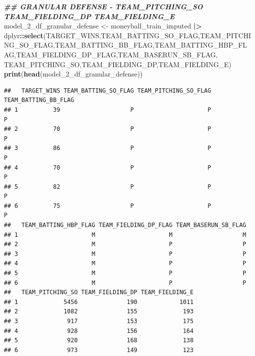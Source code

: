 \documentclass[
]{article}
\newenvironment{Shaded}{\begin{snugshade}}{\end{snugshade}}
\newcommand{\DocumentationTok}[1]{\textcolor[rgb]{0.56,0.35,0.01}{\textbf{\textit{#1}}}}
\newcommand{\FunctionTok}[1]{\textcolor[rgb]{0.13,0.29,0.53}{\textbf{#1}}}
\newcommand{\NormalTok}[1]{#1}
\newcommand{\OtherTok}[1]{\textcolor[rgb]{0.56,0.35,0.01}{#1}}
\newcommand{\SpecialCharTok}[1]{\textcolor[rgb]{0.81,0.36,0.00}{\textbf{#1}}}
\begin{document}
\begin{Shaded}
\begin{Highlighting}[]
\DocumentationTok{\#\# GRANULAR DEFENSE {-} TEAM\_PITCHING\_SO TEAM\_FIELDING\_DP TEAM\_FIELDING\_E}
\NormalTok{model\_2\_df\_granular\_defense }\OtherTok{\textless{}{-}}\NormalTok{ moneyball\_train\_imputed }\SpecialCharTok{|\textgreater{}} 
\NormalTok{  dplyr}\SpecialCharTok{::}\FunctionTok{select}\NormalTok{(TARGET\_WINS,TEAM\_BATTING\_SO\_FLAG,TEAM\_PITCHING\_SO\_FLAG,TEAM\_BATTING\_BB\_FLAG,TEAM\_BATTING\_HBP\_FLAG,TEAM\_FIELDING\_DP\_FLAG,TEAM\_BASERUN\_SB\_FLAG,}
\NormalTok{         TEAM\_PITCHING\_SO,TEAM\_FIELDING\_DP,TEAM\_FIELDING\_E)}
\FunctionTok{print}\NormalTok{(}\FunctionTok{head}\NormalTok{(model\_2\_df\_granular\_defense))}
\end{Highlighting}
\end{Shaded}

\begin{verbatim}
##   TARGET_WINS TEAM_BATTING_SO_FLAG TEAM_PITCHING_SO_FLAG TEAM_BATTING_BB_FLAG
## 1          39                    P                     P                    P
## 2          70                    P                     P                    P
## 3          86                    P                     P                    P
## 4          70                    P                     P                    P
## 5          82                    P                     P                    P
## 6          75                    P                     P                    P
##   TEAM_BATTING_HBP_FLAG TEAM_FIELDING_DP_FLAG TEAM_BASERUN_SB_FLAG
## 1                     M                     M                    M
## 2                     M                     P                    P
## 3                     M                     P                    P
## 4                     M                     P                    P
## 5                     M                     P                    P
## 6                     M                     P                    P
##   TEAM_PITCHING_SO TEAM_FIELDING_DP TEAM_FIELDING_E
## 1             5456              190            1011
## 2             1082              155             193
## 3              917              153             175
## 4              928              156             164
## 5              920              168             138
## 6              973              149             123
\end{verbatim}
\end{document}
